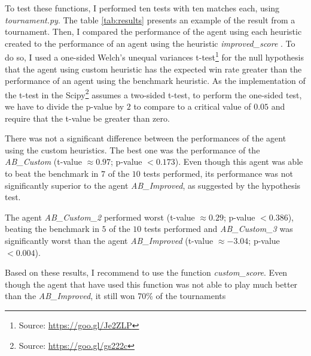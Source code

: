\documentclass[a4paper]{article}
\begin{document}
To test these functions, I performed ten tests with ten matches each, using \textit{tournament.py}. The table \ref{tab:results} presents an example of the result from a tournament. Then, I compared the performance of the agent using each heuristic created to the performance of an agent using the heuristic \textit{improved\_score} . To do so, I used a one-sided Welch's unequal variances t-test\footnote{Source: \url{https://goo.gl/Je2ZLP}} for the null hypothesis that the agent using custom heuristic has the expected win rate greater than the performance of an agent using the benchmark heuristic. As the implementation of the t-test in the Scipy\footnote{Source: \url{https://goo.gl/gs222c}} assumes a two-sided t-test, to perform the one-sided test, we have to divide the p-value by $2$ to compare to a critical value of $0.05$ and require that the t-value be greater than zero.



There was not a significant difference between the performances of the agent using the custom heuristics. The best one was the performance of the \textit{AB\_Custom} (t-value $\approx 0.97$;  p-value $< 0.173$). Even though this agent was able to beat the benchmark in $7$ of the $10$ tests performed, its performance was not significantly superior to the agent \textit{AB\_Improved}, as suggested by the hypothesis test.

The agent \textit{AB\_Custom\_2} performed worst (t-value $\approx 0.29$;  p-value $< 0.386$), beating the benchmark in $5$ of the $10$ tests performed and \textit{AB\_Custom\_3} was significantly worst than the agent \textit{AB\_Improved} (t-value $\approx -3.04$;  p-value $< 0.004$).

Based on these results, I recommend to use the function \textit{custom\_score}. Even though the agent that have used this function was not able to play much better than the \textit{AB\_Improved}, it still won 70\% of the tournaments
\end{document}
